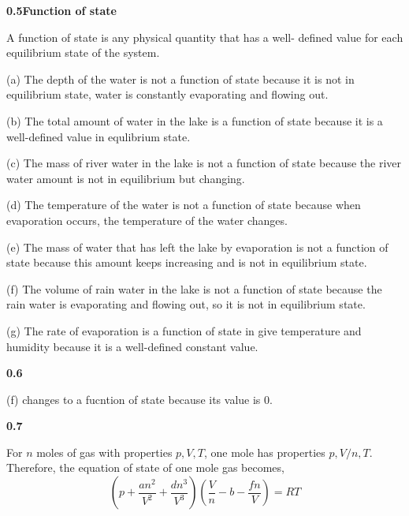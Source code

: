 \documentclass[12pt]{article}
\newcommand{\problem}[2]{%
    \par\vspace{1em}
    \noindent\textbf{#1\quad #2}
    \par\smallskip
}
\begin{document}
\smallbreak
\problem{0.5}{Function of state} A function of state is any physical quantity that has a well-
defined value for each equilibrium state of the system.

\noindent(a)  The depth of the water is not a function of state because it is not in equilibrium state, water is constantly evaporating and flowing out.

\noindent(b) The total amount of water in the lake is a function of state because it is a well-defined value in equlibrium state.

\noindent(c) The mass of river water in the lake is not a function of state because the river water amount is not in equilibrium but changing.

\noindent(d) The temperature of the water is not a function of state because when evaporation occurs, the temperature of the water changes.

\noindent(e) The mass of water that has left the lake by evaporation is not a function of state because this amount keeps increasing and is not in equilibrium state.

\noindent(f) The volume of rain water in the lake is not a function of state because the rain water is evaporating and flowing out, so it is not in equilibrium state.

\noindent(g) The rate of evaporation is a function of state in give temperature and humidity because it is a well-defined constant value.


\problem{0.6}{} (f) changes to a fucntion of state because its value is 0.


\pagebreak
\problem{0.7}{}

For $n$ moles of gas with properties $p, V, T$, one mole has properties $p, V/n, T$. 
Therefore, the equation of state of one mole gas becomes,
\begin{equation}
    \left(p + \frac{an^2}{V^2} + \frac{d n^3}{V^3}\right) \left(\frac{V}{n} - b - \frac{f n}{V}\right) = RT
\end{equation}
\end{document}
